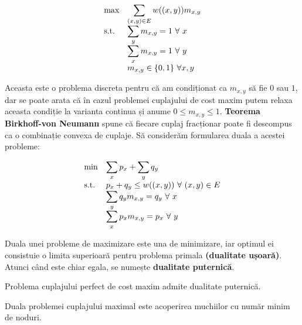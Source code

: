 \begin{equation*}
\begin{array}{ll@{}ll}
  \text{max}  & \displaystyle\sum\limits_{(x, y) \in E} w((x, y))m_{x, y} &\\
  \text{s.t.} & \displaystyle\sum\limits_{y} m_{x, y} = 1 \ \forall \ x &\\
              & \displaystyle\sum\limits_{x} m_{x, y} = 1 \ \forall \ y &\\
              & m_{x,y} \in \{0, 1\} \ \forall x, y
\end{array}
\end{equation*}

Aceasta este o problema discreta pentru că am condiționat ca $m_{x, y}$ să fie $0$ sau $1$, dar se poate arata că în cazul problemei cuplajului
de cost maxim putem relaxa aceasta condiție la varianta continua și anume $0 \leq m_{x, y} \leq 1$. \textbf{Teorema Birkhoff-von Neumann} spune
că fiecare cuplaj fracționar poate fi descompus ca o combinație convexa de cuplaje. Să considerăm formularea duala a acestei probleme:

\begin{equation*}
\begin{array}{ll@{}ll}
  \text{min}  & \displaystyle\sum\limits_{x} p_{x} + \displaystyle\sum\limits_{y} q_{y} &\\
  \text{s.t.} & p_{x} + q_{y} \leq w((x, y)) \ \forall \ (x, y) \in E &\\
              & \displaystyle\sum\limits_{y} q_{y} m_{x, y} = q_{y} \ \forall \ x &\\
              & \displaystyle\sum\limits_{x} p_{x} m_{x, y} = p_{x} \ \forall \ y &\\
\end{array}
\end{equation*}

Duala unei probleme de maximizare este una de minimizare, iar optimul ei consistuie o limita superioară pentru problema primala
\textbf{(dualitate ușoară)}. Atunci când este chiar egala, se numește \textbf{dualitate puternică}.

\begin{thm}
  Problema cuplajului perfect de cost maxim admite dualitate puternică.
\end{thm}

\begin{thm}
  Duala problemei cuplajului maximal este acoperirea muchiilor cu număr minim de noduri.
\end{thm}

